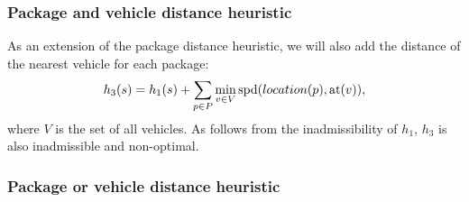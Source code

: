 \subsubsection{Package and vehicle distance heuristic}\label{sfa3}

As an extension of the package distance heuristic,
we will also add the distance of the nearest vehicle for
each package:
$$h_3(s) = h_1(s) + \sum_{p \in P} \min_{v \in V} \textrm{spd}(location(p), \textrm{at}(v)),$$
where $V$ is the set of all vehicles.
As follows from the inadmissibility of $h_1$, $h_3$
is also inadmissible and non-optimal.

\subsubsection{Package or vehicle distance heuristic}\label{sfa4}


